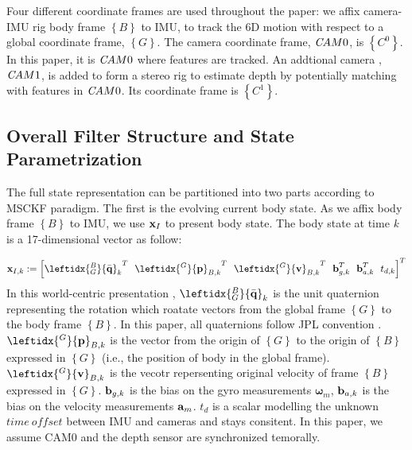 \documentclass[a4paper, 10pt, conference]{ieeeconf}      %
\begin{document}
 Four different coordinate frames are used throughout
 the paper: we affix  camera-IMU rig body frame $\left\lbrace B \right\rbrace$ to IMU, to track the 6D motion with respect to a global coordinate frame, $\left\lbrace G \right\rbrace$. The camera coordinate frame, $  \emph CAM0 $, is $\left\lbrace C^0 \right\rbrace$. In this paper, it is $\emph CAM0 $ where features are tracked. An addtional camera , $  \emph CAM1 $, is added to form a stereo rig to estimate depth by potentially matching with features in $\emph CAM0 $. Its coordinate frame is $\left\lbrace C^1 \right\rbrace$.




\subsection{Overall Filter Structure and State Parametrization}
The full  state representation can be partitioned into two parts according to MSCKF paradigm. The first is the evolving current body state. As we affix body frame $\left\lbrace B \right\rbrace$ to IMU, we use $ \textbf x_{I}  $ to present body state. The body state at time \emph k is a 17-dimensional vector as follow:

\begin {equation}
\textbf x_{I,k} :=\left[  {\leftidx{_G^B}{\bar{\textbf q}}_k}^{ T} \ \
{\leftidx{^G}{\textbf p}_{B,k}}^T \ \
{\leftidx{^G}{\textbf v}_{B,k}}^T \ \
\textbf b_{g,k}^T \ \
\textbf b_{a,k}^T \ \ 
 t_{d,k}
\right]^T 
\end{equation}
In this world-centric presentation ,  $  {\leftidx{_G^B}{\bar{\textbf q}}_k}  $ is the unit quaternion representing the rotation which roatate vectors 
from the global frame  $\left\lbrace G \right\rbrace$ to the body frame  $\left\lbrace B \right\rbrace$. In this paper, all quaternions follow JPL convention \cite{sola2012quaternion}. $ {\leftidx{^G}{\textbf p}_{B,k}} $ is the vector from the
origin of $\left\lbrace G \right\rbrace$ to the origin of $\left\lbrace B \right\rbrace$ expressed in $\left\lbrace G \right\rbrace$ (i.e., the position of body in the global frame). $ {\leftidx{^G}{\textbf v}_{B,k}} $ is the vecotr repersenting original velocity of  frame  $\left\lbrace B \right\rbrace$ expressed in  $\left\lbrace G \right\rbrace$. $ \textbf b_{g,k} $ is the
bias on the gyro measurements $  \bm{ \omega}_m  $, $ \textbf  b_{a,k} $ is the bias on the
velocity measurements $ \textbf a_m $. $t_d$ is a scalar
modelling the unknown $ time \: offset$ between IMU and cameras and stays consitent. In this paper, we assume CAM0 and the depth sensor are synchronized temorally.
\end{document}
